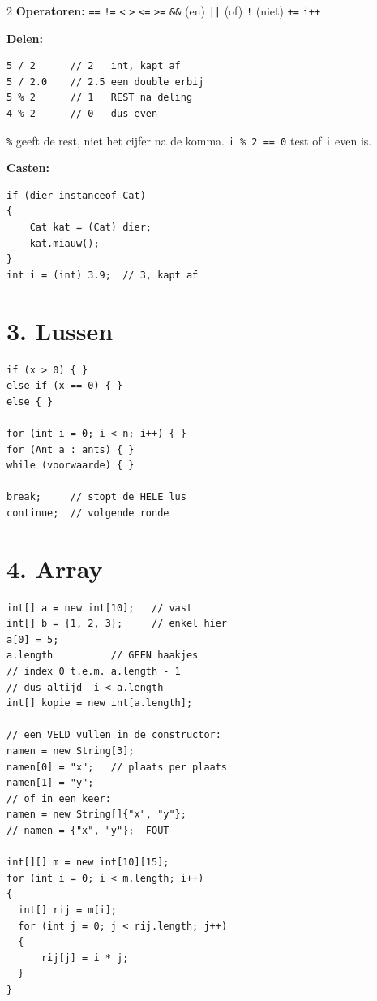 \documentclass[12pt,a4paper]{extarticle}
\begin{document}
\begin{multicols}{2}
    \textbf{Operatoren:} \texttt{==} \texttt{!=} \texttt{<} \texttt{>} \texttt{<=}
    \texttt{>=} \quad \texttt{\&\&} (en) \quad \texttt{||} (of) \quad \texttt{!}
    (niet) \quad \texttt{+=} \quad \texttt{i++}

    \textbf{Delen:}
    \begin{lstlisting}
5 / 2      // 2   int, kapt af
5 / 2.0    // 2.5 een double erbij
5 % 2      // 1   REST na deling
4 % 2      // 0   dus even
\end{lstlisting}
    \texttt{\%} geeft de rest, niet het cijfer na de komma.
    \texttt{i \% 2 == 0} test of \texttt{i} even is.

    \textbf{Casten:}
    \begin{lstlisting}
if (dier instanceof Cat)
{
    Cat kat = (Cat) dier;
    kat.miauw();
}
int i = (int) 3.9;  // 3, kapt af
\end{lstlisting}

    \section{3. Lussen}
    \begin{lstlisting}
if (x > 0) { }
else if (x == 0) { }
else { }

for (int i = 0; i < n; i++) { }
for (Ant a : ants) { }
while (voorwaarde) { }

break;     // stopt de HELE lus
continue;  // volgende ronde
\end{lstlisting}

    \section{4. Array}
    \begin{lstlisting}
int[] a = new int[10];   // vast
int[] b = {1, 2, 3};     // enkel hier
a[0] = 5;
a.length          // GEEN haakjes
// index 0 t.e.m. a.length - 1
// dus altijd  i < a.length
int[] kopie = new int[a.length];

// een VELD vullen in de constructor:
namen = new String[3];
namen[0] = "x";   // plaats per plaats
namen[1] = "y";
// of in een keer:
namen = new String[]{"x", "y"};
// namen = {"x", "y"};  FOUT

int[][] m = new int[10][15];
for (int i = 0; i < m.length; i++)
{
  int[] rij = m[i];
  for (int j = 0; j < rij.length; j++)
  {
      rij[j] = i * j;
  }
}
\end{lstlisting}


\end{multicols}
\end{document}
